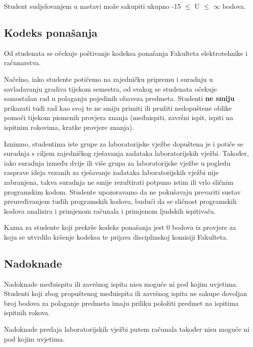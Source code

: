 \documentclass[times, 12pt, utf8]{book}
\begin{document}
Student sudjelovanjem u nastavi može sakupiti ukupno -15 $\leq$ U $\leq$ $\infty$ bodova.

\cleardoublepage  
{}  
{}
\subsection*{Kodeks ponašanja}

Od studenata se očekuje poštivanje kodeksa ponašanja Fakulteta elektrotehnike i računarstva.

Načelno, iako studente potičemo na zajedničku pripremu i suradnju u savladavanju gradiva tijekom semestra, od svakog se studenata očekuje samostalan rad u polaganju pojedinih obaveza predmeta.
Studenti \textbf{ne smiju} prikazati tuđi rad kao svoj te ne smiju primiti ili pružiti nedopuštene oblike pomoći tijekom pismenih provjera znanja (međuispiti, završni ispit, ispiti na ispitnim rokovima, kratke provjere znanja). 

Iznimno, studentima iste grupe za laboratorijske vježbe dopuštena je i potiče se suradnja s ciljem zajedničkog rješavanja zadataka laboratorijskih vježbi.
Također, iako suradnja između dvije ili više grupa za laboratorijske vježbe u pogledu rasprave ideja vezanih za rješavanje zadataka laboratorijskih vježbi nije zabranjena, takva suradnja ne smije rezultirati potpuno istim ili vrlo sličnim programskim kodom.
Studente upozoravamo da ne pokušavaju prevariti sustav preuređivanjem tuđih programskih kodova, budući da se sličnost programskih kodova analizira i primjenom računala i primjenom ljudskih ispitivača.

Kazna za studente koji prekrše kodeks ponašanja jest 0 bodova iz provjere za koju se utvrdilo kršenje kodeksa te prijava disciplinskoj komisiji Fakulteta.

\cleardoublepage  
{}  
{}
\subsection*{Nadoknade}

Nadoknade međuispita ili završnog ispita nisu moguće ni pod kojim uvjetima.
Studenti koji zbog propuštenog međuispita ili završnog ispita ne sakupe dovoljan broj bodova za polaganje predmeta imaju priliku položiti predmet na ispitima ispitnih rokova.

Nadoknade predaja laboratorijskih vježbi putem računala također nisu moguće ni pod kojim uvjetima.
\end{document}
